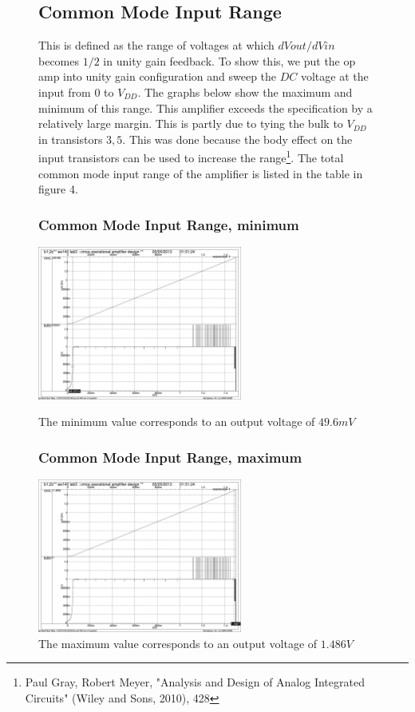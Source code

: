 \documentclass[]{article}
\begin{document}
		\begin{figure}
			\subsection{Common Mode Input Range}
			This is defined as the range of voltages at which $dVout/dVin$ becomes $1/2$ in unity gain feedback. To show this, we put the op amp into unity gain configuration and sweep the $DC$ voltage at the input from 0 to $V_{DD}$. The graphs below show the maximum and minimum of this range. This amplifier exceeds the specification by a relatively large margin. This is partly due to tying the bulk to $V_{DD}$ in transistors $3,5$. This was done because the body effect on the input transistors can be used to increase the range\footnote{\tiny Paul Gray, Robert Meyer, "Analysis and Design of Analog Integrated Circuits" (Wiley and Sons, 2010), 428}. The total common mode input range of the amplifier is listed in the table in figure 4.
				\subsubsection{Common Mode Input Range, minimum}
				\includegraphics[width=0.6\textwidth]{INPUT_RANGE_min_FINAL.pdf}
				\caption{The minimum value corresponds to an output voltage of $49.6mV$}
				\subsubsection{Common Mode Input Range, maximum}
				\includegraphics[width=0.6\textwidth]{INPUT_RANGE_max_FINAL.pdf}
				\caption{The maximum value corresponds to an output voltage of $1.486V$}

		\end{figure}
		
\end{document}
